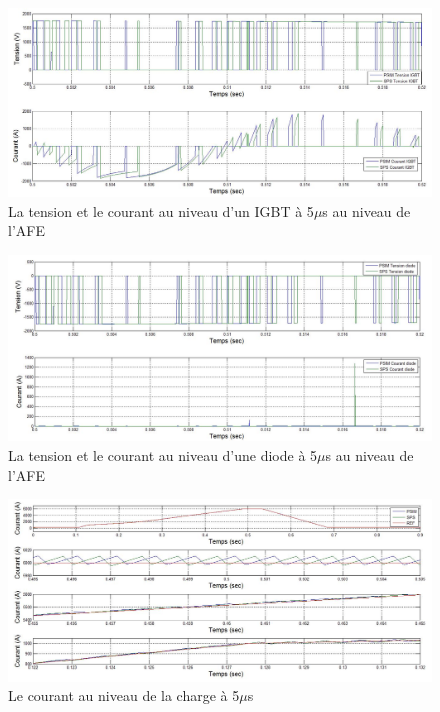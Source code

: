 \documentclass[11pt,letterpaper,final]{report}
\begin{document}
\begin{figure}[htb]
\centering
\includegraphics[scale=0.5]{Fig/DCP_AFE/5u/IGBT_afe.jpg}
\caption{La tension et le courant au niveau d'un IGBT à 5$\mu$s au niveau de l'AFE}
\label{AF_DC_IGBT5}
\end{figure}

\begin{figure}[htb]
\centering
\includegraphics[scale=0.5]{Fig/DCP_AFE/5u/ten_diode_afe.jpg}
\caption{La tension et le courant au niveau d'une diode à 5$\mu$s au niveau de l'AFE}
\label{AF_DC_DI5}
\end{figure}



\begin{figure}[htb]
\centering
\includegraphics[scale=0.5]{Fig/DCP_AFE/5u/cour_ch.jpg}
\caption{Le courant au niveau de la charge à 5$\mu$s}
\label{AF_DC_CHA5}
\end{figure}
\end{document}
